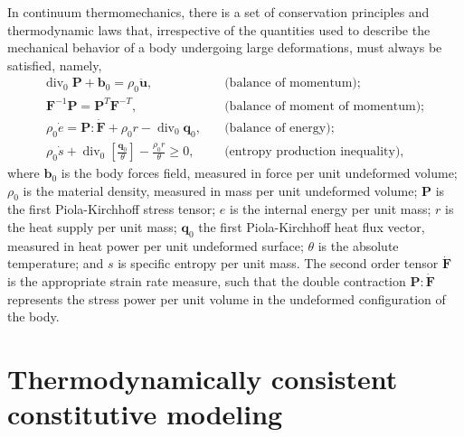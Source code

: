 In continuum thermomechanics, there is a set of conservation principles and thermodynamic laws that, irrespective of the quantities used to describe the mechanical behavior of a body undergoing large deformations, must always be satisfied, namely,
\begin{align}
  \text{div}_0\;\bm{P} + \bm{b}_0 = \rho_0 \ddot{\bm{u}},\quad & \text{(balance of momentum)};
                                                                 \label{eq:material_equilibrium}\\
  \bm{F}^{-1}\bm{P} = \bm{P}^{T}\bm{F} ^{-T},\quad & \text{(balance of moment of momentum)};\\
  \rho_0 \dot e = \bm{P} :\dot{\bm{F}} + \rho_0 r -\operatorname{div}_0 \bm{q}_0,\quad & \text{(balance of energy)};\label{eq:balance_energy}\\
  \rho_0 \dot s + \operatorname{div}_0 \left[\frac{\bm{q}_0}{\theta}\right] - \frac{\rho_0 r}{\theta} \geq 0,\quad & \text{(entropy production inequality)}\label{eq:entropy_production},
\end{align}
where $\bm{b}_0$ is the body forces field, measured in force per unit undeformed volume; $\rho_0$ is the material density, measured in mass per unit undeformed volume; \(\bm{P}\) is the first Piola-Kirchhoff stress tensor; \(e\) is the internal energy per unit mass; \(r\) is the heat supply per unit mass; \(\bm{q}_0\) the first Piola-Kirchhoff heat flux vector, measured in heat power per unit undeformed surface; $\theta$ is the absolute temperature; and $s$ is specific entropy per unit mass.
The second order tensor $\dot{\bm{F}}$ is the appropriate strain rate measure, such that the double contraction $\bm{P}:\dot{\bm{F}}$ represents the stress power per unit volume in the undeformed configuration of the body.

\section{Thermodynamically consistent constitutive modeling} \label{sec:constitutive_modeling}

